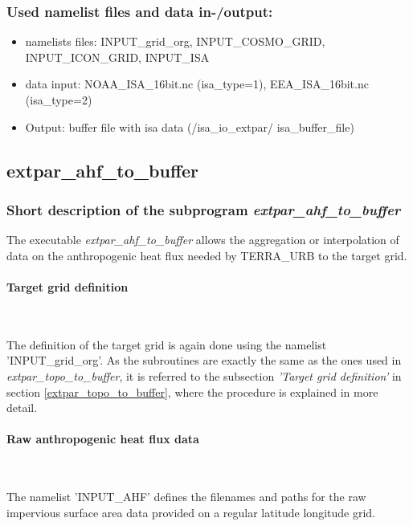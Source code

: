 \documentclass[a4paper,10pt,DIV14,BCOR1cm,titlepage,twoside]{scrartcl}
\begin{document}
\subsubsection{Used namelist files and data in-/output:}
\begin{itemize}
 \item namelists files: INPUT\_grid\_org, INPUT\_COSMO\_GRID, INPUT\_ICON\_GRID, INPUT\_ISA
 \item data input: NOAA\_ISA\_16bit.nc (isa\_type=1), EEA\_ISA\_16bit.nc (isa\_type=2) 
 \item Output: buffer file with isa data (/isa\_io\_extpar/ isa\_buffer\_file)
\end{itemize}
\subsection{extpar\_ahf\_to\_buffer}\label{extpar_ahf_to_buffer}
\subsubsection{Short description of the subprogram \textit{extpar\_ahf\_to\_buffer}}
The executable \textit{extpar\_ahf\_to\_buffer} allows the aggregation or interpolation of data on the anthropogenic heat flux needed by TERRA\_URB to the target grid. \par\medskip\noindent
\paragraph{Target grid definition} \ \par\medskip\noindent
The definition of the target grid is again done using the namelist 'INPUT\_grid\_org'. As the subroutines are exactly the same as the ones used in \textit{extpar\_topo\_to\_buffer}, it is referred to the subsection \textit{'Target grid definition'} in section \ref{extpar_topo_to_buffer}, where the procedure is explained in more detail. \par\medskip\noindent
\paragraph{Raw anthropogenic heat flux data}\ \par\medskip\noindent
The namelist 'INPUT\_AHF' defines the filenames and paths for the raw impervious surface area data provided on a regular latitude longitude grid.\par\medskip\noindent
\end{document}
